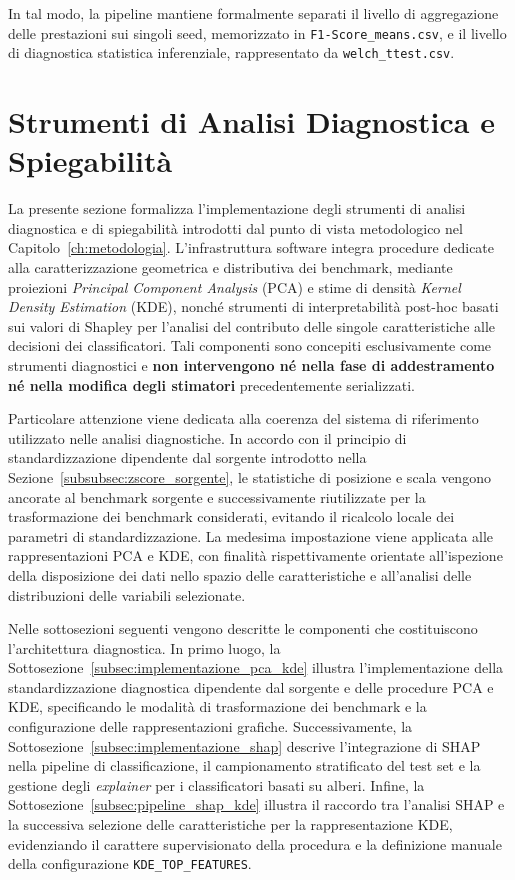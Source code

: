 In tal modo, la pipeline mantiene formalmente separati il livello di aggregazione delle prestazioni sui singoli seed, memorizzato in \texttt{F1-Score\_means.csv}, e il livello di diagnostica statistica inferenziale, rappresentato da \texttt{welch\_ttest.csv}.


\section{Strumenti di Analisi Diagnostica e Spiegabilità}
\label{sec:strumenti_analisi_diagnostica}

La presente sezione formalizza l'implementazione degli strumenti di analisi diagnostica e di spiegabilità introdotti dal punto di vista metodologico nel Capitolo~\ref{ch:metodologia}.
L'infrastruttura software integra procedure dedicate alla caratterizzazione geometrica e distributiva dei benchmark, mediante proiezioni \textit{Principal Component Analysis} (PCA) e stime di densità \textit{Kernel Density Estimation} (KDE), nonché strumenti di interpretabilità post-hoc basati sui valori di Shapley per l'analisi del contributo delle singole caratteristiche alle decisioni dei classificatori.
Tali componenti sono concepiti esclusivamente come strumenti diagnostici e \textbf{non intervengono né nella fase di addestramento né nella modifica degli stimatori} precedentemente serializzati.

Particolare attenzione viene dedicata alla coerenza del sistema di riferimento utilizzato nelle analisi diagnostiche.
In accordo con il principio di standardizzazione dipendente dal sorgente introdotto nella Sezione~\ref{subsubsec:zscore_sorgente}, le statistiche di posizione e scala vengono ancorate al benchmark sorgente e successivamente riutilizzate per la trasformazione dei benchmark considerati, evitando il ricalcolo locale dei parametri di standardizzazione.
La medesima impostazione viene applicata alle rappresentazioni PCA e KDE, con finalità rispettivamente orientate all'ispezione della disposizione dei dati nello spazio delle caratteristiche e all'analisi delle distribuzioni delle variabili selezionate.

Nelle sottosezioni seguenti vengono descritte le componenti che costituiscono l'architettura diagnostica.
In primo luogo, la Sottosezione~\ref{subsec:implementazione_pca_kde} illustra l'implementazione della standardizzazione diagnostica dipendente dal sorgente e delle procedure PCA e KDE, specificando le modalità di trasformazione dei benchmark e la configurazione delle rappresentazioni grafiche.
Successivamente, la Sottosezione~\ref{subsec:implementazione_shap} descrive l'integrazione di SHAP nella pipeline di classificazione, il campionamento stratificato del test set e la gestione degli \textit{explainer} per i classificatori basati su alberi.
Infine, la Sottosezione~\ref{subsec:pipeline_shap_kde} illustra il raccordo tra l'analisi SHAP e la successiva selezione delle caratteristiche per la rappresentazione KDE, evidenziando il carattere supervisionato della procedura e la definizione manuale della configurazione \texttt{KDE\_TOP\_FEATURES}.

